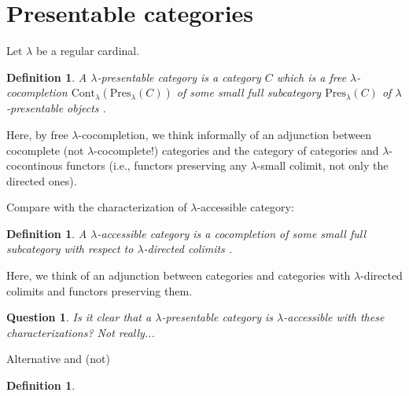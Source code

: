 \documentclass{article}
\newcommand{\CC}{\mathsf{C}}
\newcommand{\Cont}[1]{\text{Cont}_{#1}}
\newcommand{\Pres}[1]{\text{Pres}_{#1}}
\newcommand{\Set}{\text{Set}}
\newtheorem{definition}[theorem]{Definition}
\newtheorem{question}[theorem]{Question}
\begin{document}
  \section{Presentable categories}
  Let $\lambda$ be a regular cardinal.
  \begin{definition}
  A $\lambda$-presentable category is a
  category $C$ which is a free $\lambda$-cocompletion
  $\Cont\lambda(\Pres\lambda(C))$ of
  some small full subcategory $\Pres\lambda(C)$ of \emph{$\lambda$-presentable
    objects} \cite[Representation theorem 1.46]{adamek_rosicky}.
  \end{definition}

  Here, by free $\lambda$-cocompletion, we think informally of an adjunction between
  cocomplete (not $\lambda$-cocomplete!) categories and the category of
  categories and $\lambda$-cocontinous functors (i.e., functors preserving any
  $\lambda$-small colimit, not only the directed ones).

  Compare with the characterization of $\lambda$-accessible category:
  \begin{definition}
  A $\lambda$-accessible category is a cocompletion of some small full subcategory with respect to $\lambda$-directed colimits
  \cite[Representation theorem 2.26]{adamek_rosicky}. 
  \end{definition}
  Here, we think of an
  adjunction between categories and categories with $\lambda$-directed colimits
  and functors preserving them.
  \begin{question}
   Is it clear that a $\lambda$-presentable category is $\lambda$-accessible
   with these characterizations? Not really...
  \end{question}
  Alternative and (not)
  \begin{definition}
    
  \end{definition}
\end{document}
